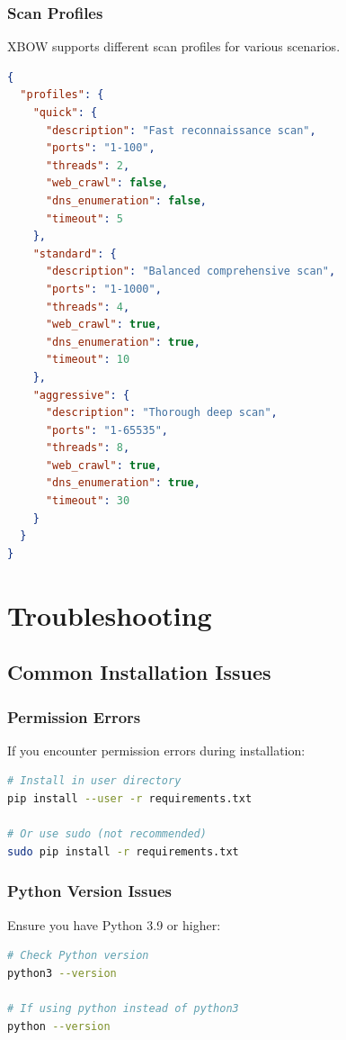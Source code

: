 \documentclass[12pt,a4paper]{report}
\begin{document}
\subsubsection{Scan Profiles}

XBOW supports different scan profiles for various scenarios.

\begin{lstlisting}[language=json]
{
  "profiles": {
    "quick": {
      "description": "Fast reconnaissance scan",
      "ports": "1-100",
      "threads": 2,
      "web_crawl": false,
      "dns_enumeration": false,
      "timeout": 5
    },
    "standard": {
      "description": "Balanced comprehensive scan",
      "ports": "1-1000",
      "threads": 4,
      "web_crawl": true,
      "dns_enumeration": true,
      "timeout": 10
    },
    "aggressive": {
      "description": "Thorough deep scan",
      "ports": "1-65535",
      "threads": 8,
      "web_crawl": true,
      "dns_enumeration": true,
      "timeout": 30
    }
  }
}
\end{lstlisting}

\section{Troubleshooting}

\subsection{Common Installation Issues}

\subsubsection{Permission Errors}

If you encounter permission errors during installation:

\begin{lstlisting}[language=bash]
# Install in user directory
pip install --user -r requirements.txt

# Or use sudo (not recommended)
sudo pip install -r requirements.txt
\end{lstlisting}

\subsubsection{Python Version Issues}

Ensure you have Python 3.9 or higher:

\begin{lstlisting}[language=bash]
# Check Python version
python3 --version

# If using python instead of python3
python --version
\end{lstlisting}
\end{document}
